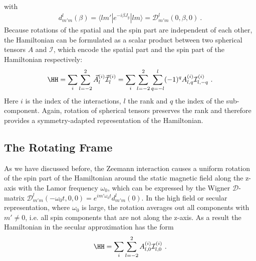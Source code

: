 with
\begin{align}
 d_{m'm}^{l}(\beta )=\langle lm'|e^{-i\beta J_{y}}|lm\rangle = \mathcal{D}_{m'm}^{l}(0,\beta ,0)~.
\end{align}
Because rotations of the spatial and the spin part are independent of each other, the Hamiltonian can be formulated  as a scalar product between two spherical tensors $A$ and $\mathcal{I}$, which encode the spatial part and the spin part of the Hamiltonian respectively:
\begin{align}
\HH =   \sum_i \sum^2_{l=-2} \vec{A}^{(i)}_l \vec{\mathcal{I}}^{(i)}_l = \sum_i \sum^{2}_{l=-2}\sum_{q=-l}^l (-1)^q A^{(i)}_{l,q} \mathcal{I}^{(i)}_{l,-q}~.
\end{align}
Here $i$ is the index of the interactions, $l$ the rank and $q$ the index of the sub-component.
Again, rotation of spherical tensors preserves the rank and therefore provides a symmetry-adapted representation of the Hamiltonian.


\subsection{The Rotating Frame}
\label{sec:secular}
As we have discussed before, the Zeemann interaction causes a uniform rotation of the spin part of the Hamiltonian around the static magnetic field along the z-axis with the Lamor frequency $\omega_0$, which can be expressed by the Wigner $\mathcal{D}$-matrix
$\mathcal{D}_{m'm}^{l}(- \omega_0 t, 0 ,0) = e^{i m' \omega_0 t}d_{m'm}^{l}(0)$. In the high field or secular representation, where $\omega_0$ is large, the rotation averages out all components with $m'\neq 0$, i.e. all spin components that are not along the z-axis. 
As a result the Hamiltonian in the secular approximation has the form 
\begin{align}
  \HH =  \sum_i \sum^{2}_{l=-2} A^{(i)}_{l,0} \mathcal{I}^{(i)}_{l,0}~.
\end{align}

